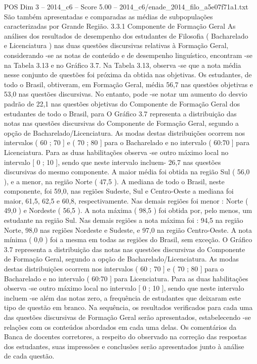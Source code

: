 \begin{textsample}{POS Dim 3 – 2014\_c6 – Score 5.00 – 2014\_c6/enade\_2014\_filo\_a5e07f71a1.txt}
São também apresentadas e comparadas as médias de subpopulações caracterizadas por Grande Região. 3.3.1 Componente de Formação Geral As análises dos resultados de desempenho dos estudantes de Filosofia ( Bacharelado e Licenciatura ) nas duas questões discursivas relativas à Formação Geral, considerando -se as notas de conteúdo e de desempenho linguístico, encontram -se na Tabela 3.13 e no Gráfico 3.7.
Na Tabela 3.13, observa -se que a nota média nesse conjunto de questões foi próxima da obtida nas objetivas.
Os estudantes, de todo o Brasil, obtiveram, em Formação Geral, média 56,7 nas questões objetivas e 53,0 nas questões discursivas.
No entanto, pode -se notar um aumento do desvio padrão de 22,1 nas questões objetivas do Componente de Formação Geral dos estudantes de todo o Brasil, para O Gráfico 3.7 representa a distribuição das notas nas questões discursivas do Componente de Formação Geral, segundo a opção de Bacharelado/Licenciatura.
As modas destas distribuições ocorrem nos intervalos ( 60 ; 70 ] e ( 70 ; 80 ] para o Bacharelado e no intervalo ( 60:70 ] para Licenciatura.
Para as duas habilitações observa -se outro máximo local no intervalo [ 0 ; 10 ], sendo que neste intervalo incluem- 26,7 nas questões discursivas do mesmo componente.
A maior média foi obtida na região Sul ( 56,0 ), e a menor, na região Norte ( 47,5 ).
A mediana de todo o Brasil, neste componente, foi 59,0, nas regiões Sudeste, Sul e Centro-Oeste a mediana foi maior, 61,5, 62,5 e 60,8, respectivamente.
Nas demais regiões foi menor : Norte ( 49,0 ) e Nordeste ( 56,5 ).
A nota máxima ( 98,5 ) foi obtida por, pelo menos, um estudante na região Sul.
Nas demais regiões a nota máxima foi : 94,5 na região Norte, 98,0 nas regiões Nordeste e Sudeste, e 97,0 na região Centro-Oeste.
A nota mínima ( 0,0 ) foi a mesma em todas as regiões do Brasil, sem exceção.
O Gráfico 3.7 representa a distribuição das notas nas questões discursivas do Componente de Formação Geral, segundo a opção de Bacharelado/Licenciatura.
As modas destas distribuições ocorrem nos intervalos ( 60 ; 70 ] e ( 70 ; 80 ] para o Bacharelado e no intervalo ( 60:70 ] para Licenciatura.
Para as duas habilitações observa -se outro máximo local no intervalo [ 0 ; 10 ], sendo que neste intervalo incluem -se além das notas zero, a frequência de estudantes que deixaram este tipo de questão em branco.
Na sequência, os resultados verificados para cada uma das questões discursivas de Formação Geral serão apresentados, estabelecendo -se relações com os conteúdos abordados em cada uma delas.
Os comentários da Banca de docentes corretores, a respeito do observado na correção das respostas dos estudantes, suas impressões e conclusões serão apresentados junto à análise de cada questão.

\end{textsample}
